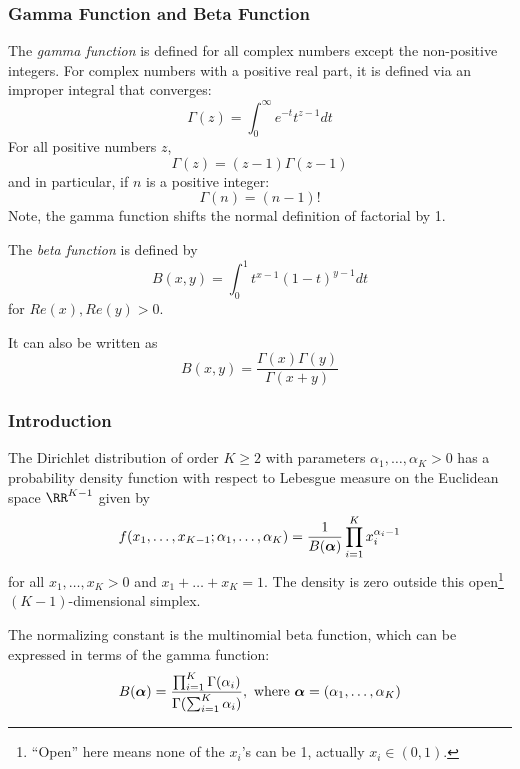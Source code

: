 \subsubsection{Gamma Function and Beta Function}
The {\em{gamma function}} is defined for all complex numbers except the non-positive integers. For complex numbers with a positive real part, it is defined via an improper integral that converges:
\begin{equation}
	\Gamma(z) = \int_0^\infty e^{-t} t^{z-1} dt
\end{equation}
For all positive numbers $z$,
\begin{equation}
	\Gamma(z) = (z-1)\Gamma(z-1)
\end{equation}
and in particular, if $n$ is a positive integer:
\begin{equation}
	\Gamma(n) = (n-1)!
\end{equation}
Note, the gamma function shifts the normal definition of factorial by 1.

The {\em{beta function}} is defined by
\begin{equation}
	B(x,y) = \int_0^1 t^{x-1} (1-t)^{y-1} dt
\end{equation}
for $Re(x), Re(y) > 0$.

It can also be written as
\begin{equation}
	B(x,y) = \frac{\Gamma(x) \Gamma(y)}{\Gamma(x+y)}
\end{equation}

\subsubsection{Introduction}
The Dirichlet distribution of order $K \ge 2$ with parameters $\alpha_1, \dots, \alpha_K > 0$ has a probability density function with respect to Lebesgue measure on the Euclidean space $\RR^{K-1}$ given by
\begin{equation}
	f(x_1, \dots, x_{K-1}; \alpha_1, \dots, \alpha_K) = \frac{1}{B({\boldsymbol{\alpha}})} \prod^K_{i=1} x_i^{\alpha_i-1}
\end{equation}
for all $x_1, \dots, x_K > 0$ and $x_1 + \dots + x_K = 1$. The density is zero outside this open\footnote{``Open'' here means none of the $x_i$'s can be 1, actually $x_i \in (0,1)$.} $(K-1)$-dimensional simplex.

The normalizing constant is the multinomial beta function, which can be expressed in terms of the gamma function:
\begin{equation}
	B({\boldsymbol{\alpha}}) = \frac{\prod_{i=1}^K \Gamma(\alpha_i)}{\Gamma(\sum_{i=1}^K \alpha_i)}, \mbox{ where } {\boldsymbol{\alpha}}=(\alpha_1, \dots, \alpha_K)
\end{equation}


